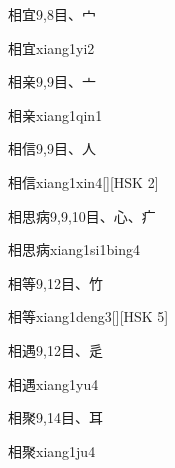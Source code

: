 \begin{entry}{相宜}{9,8}{⽬、⼧}
  \begin{phonetics}{相宜}{xiang1yi2}
  \end{phonetics}
\end{entry}

\begin{entry}{相亲}{9,9}{⽬、⼇}
  \begin{phonetics}{相亲}{xiang1qin1}
  \end{phonetics}
\end{entry}

\begin{entry}{相信}{9,9}{⽬、⼈}
  \begin{phonetics}{相信}{xiang1xin4}[][HSK 2]
  \end{phonetics}
\end{entry}

\begin{entry}{相思病}{9,9,10}{⽬、⼼、⽧}
  \begin{phonetics}{相思病}{xiang1si1bing4}
  \end{phonetics}
\end{entry}

\begin{entry}{相等}{9,12}{⽬、⽵}
  \begin{phonetics}{相等}{xiang1deng3}[][HSK 5]
  \end{phonetics}
\end{entry}

\begin{entry}{相遇}{9,12}{⽬、⾡}
  \begin{phonetics}{相遇}{xiang1yu4}
  \end{phonetics}
\end{entry}

\begin{entry}{相聚}{9,14}{⽬、⽿}
  \begin{phonetics}{相聚}{xiang1ju4}
  \end{phonetics}
\end{entry}

